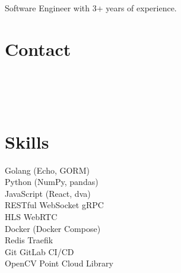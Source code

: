 \documentclass[]{deedy-resume}
\begin{document}
%
%
\lastupdated

%
%
{Software Engineer with 3+ years of experience.}

%
%
\begin{minipage}[t]{0.32\textwidth} 

\section{Contact}
{\parskip3pt
\href{mailto:devcchsu@gmail.com}{}\vspace{3pt} \\
\href{https://www.linkedin.com/in/devcchsu}{}\vspace{3pt} \\
\href{https://github.com/wuchihsu}{}\vspace{3pt} \\
\href{https://goo.gl/maps/CGLqV6QWdAYszMuo9}{}
}
\sectionsep

\section{Skills}
\textbullet{} Golang (Echo, GORM)
\\\textbullet{} Python (NumPy, pandas)
\\\textbullet{} JavaScript (React, dva)
\\\textbullet{} RESTful \textbullet{} WebSocket \textbullet{} gRPC
\\\textbullet{} HLS \textbullet{} WebRTC
\\\textbullet{} Docker (Docker Compose)
\\\textbullet{} Redis \textbullet{} Traefik
\\\textbullet{} Git \textbullet{} GitLab CI/CD
\\\textbullet{} OpenCV \textbullet{} Point Cloud Library
\sectionsep


\end{minipage}
\end{document}
